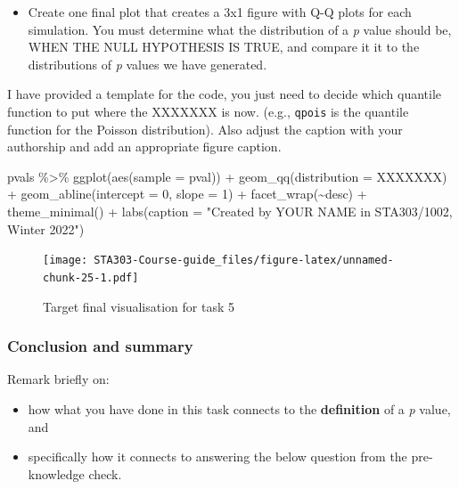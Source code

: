 \documentclass[
  openany]{book}
\newenvironment{Shaded}{\begin{snugshade}}{\end{snugshade}}
\newcommand{\AttributeTok}[1]{\textcolor[rgb]{0.77,0.63,0.00}{#1}}
\newcommand{\DecValTok}[1]{\textcolor[rgb]{0.00,0.00,0.81}{#1}}
\newcommand{\FunctionTok}[1]{\textcolor[rgb]{0.00,0.00,0.00}{#1}}
\newcommand{\NormalTok}[1]{#1}
\newcommand{\SpecialCharTok}[1]{\textcolor[rgb]{0.00,0.00,0.00}{#1}}
\newcommand{\StringTok}[1]{\textcolor[rgb]{0.31,0.60,0.02}{#1}}
\providecommand{\tightlist}{%
  \setlength{\itemsep}{0pt}\setlength{\parskip}{0pt}}
\begin{document}
\begin{itemize}
\tightlist
\item
  Create one final plot that creates a 3x1 figure with Q-Q plots for each simulation. You must determine what the distribution of a \emph{p} value should be, WHEN THE NULL HYPOTHESIS IS TRUE, and compare it it to the distributions of \emph{p} values we have generated.
\end{itemize}

I have provided a template for the code, you just need to decide which quantile function to put where the XXXXXXX is now. (e.g., \texttt{qpois} is the quantile function for the Poisson distribution). Also adjust the caption with your authorship and add an appropriate figure caption.

\begin{Shaded}
\begin{Highlighting}[]
\NormalTok{pvals }\SpecialCharTok{\%\textgreater{}\%} 
  \FunctionTok{ggplot}\NormalTok{(}\FunctionTok{aes}\NormalTok{(}\AttributeTok{sample =}\NormalTok{ pval)) }\SpecialCharTok{+}
  \FunctionTok{geom\_qq}\NormalTok{(}\AttributeTok{distribution =}\NormalTok{ XXXXXXX) }\SpecialCharTok{+}
  \FunctionTok{geom\_abline}\NormalTok{(}\AttributeTok{intercept =} \DecValTok{0}\NormalTok{, }\AttributeTok{slope =} \DecValTok{1}\NormalTok{) }\SpecialCharTok{+}
  \FunctionTok{facet\_wrap}\NormalTok{(}\SpecialCharTok{\textasciitilde{}}\NormalTok{desc) }\SpecialCharTok{+}
  \FunctionTok{theme\_minimal}\NormalTok{() }\SpecialCharTok{+}
  \FunctionTok{labs}\NormalTok{(}\AttributeTok{caption =} \StringTok{"Created by YOUR NAME in STA303/1002, Winter 2022"}\NormalTok{)}
  
\end{Highlighting}
\end{Shaded}

\begin{figure}
\centering
\texttt{[image: STA303-Course-guide\_files/figure-latex/unnamed-chunk-25-1.pdf]}
\caption{\label{fig:unnamed-chunk-25}Target final visualisation for task 5}
\end{figure}

\hypertarget{conclusion-and-summary}{%
\subsubsection{Conclusion and summary}\label{conclusion-and-summary}}

Remark briefly on:

\begin{itemize}
\tightlist
\item
  how what you have done in this task connects to the \textbf{definition} of a \emph{p} value, and\\
\item
  specifically how it connects to answering the below question from the pre-knowledge check.
\end{itemize}
\end{document}
